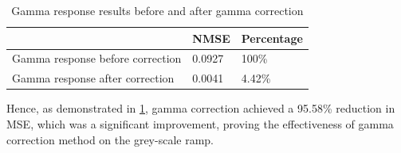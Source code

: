 \begin{table}[H]
  \caption{Gamma response results before and after gamma correction}
  \centering
  \label{tab:Gamma response result}
  \begin{tabular}{lll}
    \toprule
                                     & NMSE   & Percentage \\
    \midrule
    Gamma response before correction & 0.0927 & 100\%      \\
    Gamma response after correction  & 0.0041 & 4.42\%     \\
    \bottomrule
  \end{tabular}
\end{table}
Hence, as demonstrated in \cref{tab:Gamma response result}, gamma correction achieved a 95.58\% reduction in MSE, which was a significant improvement, proving the effectiveness of gamma correction method on the grey-scale ramp.





